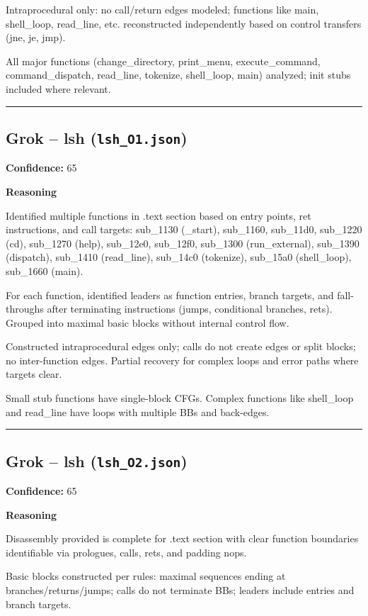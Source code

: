 Intraprocedural only: no call/return edges modeled; functions like main, shell\_loop, read\_line, etc. reconstructed independently based on control transfers (jne, je, jmp).

All major functions (change\_directory, print\_menu, execute\_command, command\_dispatch, read\_line, tokenize, shell\_loop, main) analyzed; init stubs included where relevant.

\bigskip
\hrule
\bigskip

\subsection{Grok -- lsh (\texttt{lsh\_O1.json})}

\textbf{Confidence:} 65

\textbf{Reasoning}

Identified multiple functions in .text section based on entry points, ret instructions, and call targets: sub\_1130 (\_start), sub\_1160, sub\_11d0, sub\_1220 (cd), sub\_1270 (help), sub\_12e0, sub\_12f0, sub\_1300 (run\_external), sub\_1390 (dispatch), sub\_1410 (read\_line), sub\_14c0 (tokenize), sub\_15a0 (shell\_loop), sub\_1660 (main).

For each function, identified leaders as function entries, branch targets, and fall-throughs after terminating instructions (jumps, conditional branches, rets). Grouped into maximal basic blocks without internal control flow.

Constructed intraprocedural edges only; calls do not create edges or split blocks; no inter-function edges. Partial recovery for complex loops and error paths where targets clear.

Small stub functions have single-block CFGs. Complex functions like shell\_loop and read\_line have loops with multiple BBs and back-edges.

\bigskip
\hrule
\bigskip

\subsection{Grok -- lsh (\texttt{lsh\_O2.json})}

\textbf{Confidence:} 65

\textbf{Reasoning}

Disassembly provided is complete for .text section with clear function boundaries identifiable via prologues, calls, rets, and padding nops.

Basic blocks constructed per rules: maximal sequences ending at branches/returns/jumps; calls do not terminate BBs; leaders include entries and branch targets.

